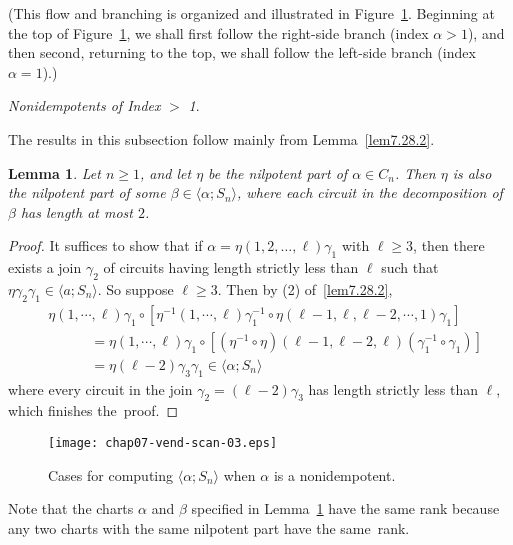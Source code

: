 \documentclass{surv-l}
\numberwithin{equation}{section}
\numberwithin{table}{section}
\numberwithin{figure}{section}
\newtheorem{lemma}[equation]{Lemma}
\theoremstyle{definition}
\begin{document}
(This flow and branching is organized and illustrated in
Figure~\ref{fig7.32.2}. Beginning at the top of
Figure~\ref{fig7.32.2}, we shall first follow the right-side
branch (index $\alpha>1$), and then second, returning to the top,
we shall follow the left-side branch (index $\alpha=1$).)

\begin{center}
\emph{Nonidempotents of Index} $>$ \emph{1}.
\end{center}

The results in this subsection follow mainly from
Lemma~\ref{lem7.28.2}.

\begin{lemma}\label{lem7.32.1}
Let $n \geq 1$, and let $\eta$ be the nilpotent part of $\alpha\in
C_{n}$. Then $\eta$ is also the nilpotent part of some
$\beta\in\langle\alpha;S_{n}\rangle$, where each circuit in the
decomposition of $\beta$ has length at most $2$.
\end{lemma}

\begin{proof} It suffices to show that if $\alpha=\eta(1,2,\ldots,
\ell)\gamma_{1}$ with $\ell\geq 3$, then there exists a join
$\gamma_{2}$ of circuits having length strictly less than $\ell$ such
that $\eta\gamma_{2}\gamma_{1}\in\langle a;S_{n}\rangle$. So
suppose $\ell\geq 3$. Then by (2) of~\ref{lem7.28.2},
\begin{align*}
&\eta(1,\cdots,\ell)\gamma_{1}\circ [\eta^{-1}(1,\cdots,
\ell)\gamma_{1}^{-1}\circ\eta(\ell-1, \ell, \ell-2, \cdots,1)\gamma_{1}]\\
&\qquad\quad =\eta(1, \cdots, \ell)\gamma_{1}\circ [(\eta^{-1}\circ\eta)(\ell-1, \ell-2, \ell)(\gamma_{1}^{-1}\circ\gamma_{1})] \\
&\qquad\quad =\eta(\ell-2)\gamma_{3}\gamma_{1}\in\langle\alpha;S_{n}\rangle
\end{align*}
where every circuit in the join $\gamma_{2}=(\ell-2)\gamma_{3}$
has length strictly less than $\ell$, which finishes the~proof.
\end{proof}

\setcounter{figure}{1}
\begin{figure}[!h]
\texttt{[image: chap07-vend-scan-03.eps]}
\caption{Cases for computing $\langle\alpha;S_{n}\rangle$ when $\alpha$ is
a nonidempotent.\label{fig7.32.2}}
\end{figure}

Note that the charts $\alpha$ and $\beta$ specified in
Lemma~\ref{lem7.32.1} have the same rank because any two charts
with the same nilpotent part have the same~rank.
\end{document}
